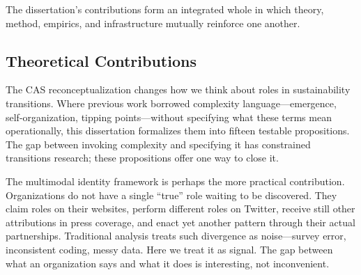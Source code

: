 \documentclass[../main.tex]{subfiles}
\begin{document}
\begin{center}
\label{fig:conclusion:contributions}
\end{center}

The dissertation's contributions form an integrated whole in which theory, method, empirics, and infrastructure mutually reinforce one another.

\subsection{Theoretical Contributions}

The CAS reconceptualization changes how we think about roles in sustainability transitions. Where previous work borrowed complexity language---emergence, self-organization, tipping points---without specifying what these terms mean operationally, this dissertation formalizes them into fifteen testable propositions. The gap between invoking complexity and specifying it has constrained transitions research; these propositions offer one way to close it.

The multimodal identity framework is perhaps the more practical contribution. Organizations do not have a single ``true'' role waiting to be discovered. They claim roles on their websites, perform different roles on Twitter, receive still other attributions in press coverage, and enact yet another pattern through their actual partnerships. Traditional analysis treats such divergence as noise---survey error, inconsistent coding, messy data. Here we treat it as signal. The gap between what an organization says and what it does is interesting, not inconvenient.
\end{document}
